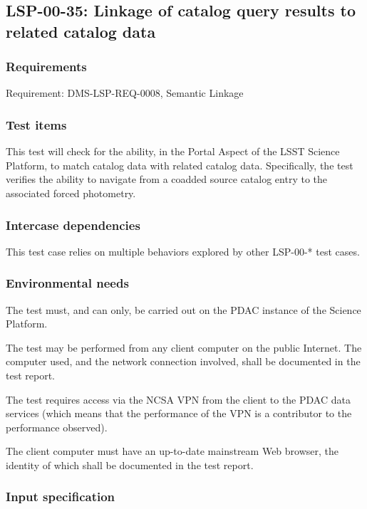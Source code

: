 \subsection{LSP-00-35: Linkage of catalog query results to related catalog data}
\label{lsp-00-35}

\subsubsection{Requirements}

Requirement: DMS-LSP-REQ-0008, Semantic Linkage

\subsubsection{Test items}

This test will check for the ability, in the Portal Aspect of the LSST Science Platform, to match catalog data with related catalog data.  
Specifically, the test verifies the ability to navigate from a coadded source catalog entry to the associated forced photometry.


\subsubsection{Intercase dependencies}

This test case relies on multiple behaviors explored by other LSP-00-* test cases.


\subsubsection{Environmental needs}

The test must, and can only, be carried out on the PDAC instance of the Science Platform.

The test may be performed from any client computer on the public Internet.
The computer used, and the network connection involved, shall be documented in the test report.

The test requires access via the NCSA VPN from the client to the PDAC data services 
(which means that the performance of the VPN is a contributor to the performance observed).

The client computer must have an up-to-date mainstream Web browser, the identity of which shall be documented in the test report.


\subsubsection{Input specification}

